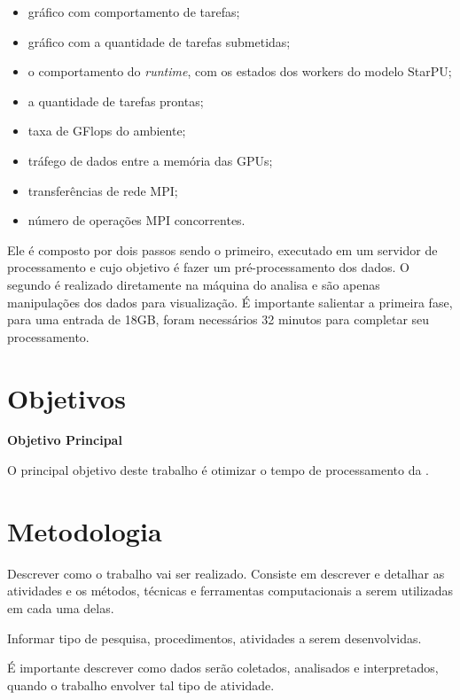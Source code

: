 \documentclass[prop-esp]{iiufrgs}
\begin{document}
\begin{itemize}
    \item gráfico com comportamento de tarefas;
    \item gráfico com a quantidade de tarefas submetidas;
    \item o comportamento do \emph{runtime}, com os estados dos workers do modelo StarPU;
    \item a quantidade de tarefas prontas;
    \item taxa de GFlops do ambiente;
    \item tráfego de dados entre a memória das GPUs;
    \item transferências de rede MPI;
    \item número de operações MPI concorrentes.
\end{itemize}

Ele é composto por dois passos sendo o primeiro, executado em um servidor de processamento e cujo objetivo é fazer um pré-processamento dos dados.
O segundo é realizado diretamente na máquina do analisa e são apenas manipulações dos dados para visualização. É importante salientar a primeira fase, para uma entrada de 18GB, foram necessários 32 minutos para completar seu processamento.


%
\chapter{Objetivos}

\noindent \textbf{Objetivo Principal} 

O principal objetivo deste trabalho é otimizar o tempo de processamento da .


%
\chapter{Metodologia}

Descrever como o trabalho vai ser realizado. Consiste em descrever e detalhar as atividades e os métodos, técnicas e ferramentas computacionais a serem utilizadas em cada uma delas. 

Informar tipo de pesquisa, procedimentos, atividades a serem desenvolvidas.

É importante descrever como dados serão coletados, analisados e interpretados, quando o trabalho envolver tal tipo de atividade.
\end{document}
